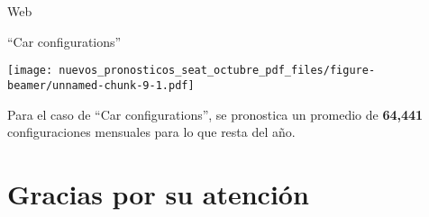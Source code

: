 \documentclass[ignorenonframetext,]{beamer}
\begin{document}
\begin{frame}{Web}

\begin{block}{``Car configurations''}

\texttt{[image: nuevos\_pronosticos\_seat\_octubre\_pdf\_files/figure-beamer/unnamed-chunk-9-1.pdf]}

Para el caso de ``Car configurations'', se pronostica un promedio de
\textbf{64,441} configuraciones mensuales para lo que resta del año.

\end{block}

\end{frame}

\section{Gracias por su atención}\label{gracias-por-su-atencion}
\end{document}
